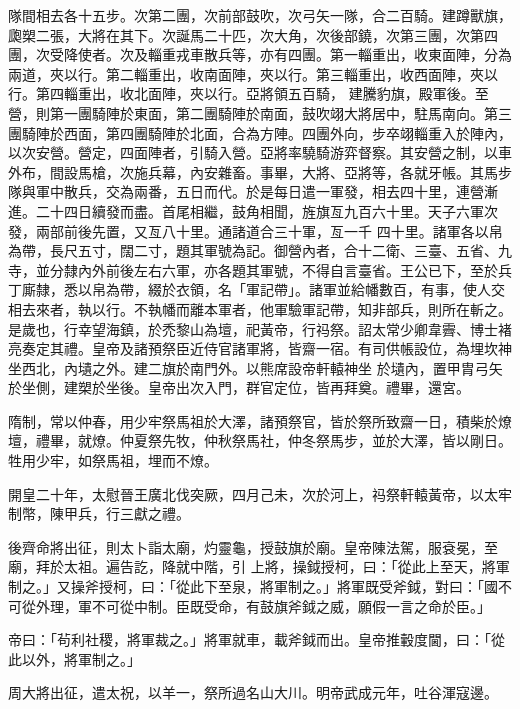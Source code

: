 \begin{pinyinscope}
 隊間相去各十五步。次第二團，次前部鼓吹，次弓矢一隊，合二百騎。建蹲獸旗，瓟槊二張，大將在其下。次誕馬二十匹，次大角，次後部鐃，次第三團，次第四團，次受降使者。次及輜重戎車散兵等，亦有四團。第一輜重出，收東面陣，分為兩道，夾以行。第二輜重出，收南面陣，夾以行。第三輜重出，收西面陣，夾以行。第四輜重出，收北面陣，夾以行。亞將領五百騎，
 建騰豹旗，殿軍後。至營，則第一團騎陣於東面，第二團騎陣於南面，鼓吹翊大將居中，駐馬南向。第三團騎陣於西面，第四團騎陣於北面，合為方陣。四團外向，步卒翊輜重入於陣內，以次安營。營定，四面陣者，引騎入營。亞將率驍騎游弈督察。其安營之制，以車外布，間設馬槍，次施兵幕，內安雜畜。事畢，大將、亞將等，各就牙帳。其馬步隊與軍中散兵，交為兩番，五日而代。於是每日遣一軍發，相去四十里，連營漸進。二十四日續發而盡。首尾相繼，鼓角相聞，旌旗亙九百六十里。天子六軍次發，兩部前後先置，又亙八十里。通諸道合三十軍，亙一千
 四十里。諸軍各以帛為帶，長尺五寸，闊二寸，題其軍號為記。御營內者，合十二衛、三臺、五省、九寺，並分隸內外前後左右六軍，亦各題其軍號，不得自言臺省。王公已下，至於兵丁廝隸，悉以帛為帶，綴於衣領，名「軍記帶」。諸軍並給幡數百，有事，使人交相去來者，執以行。不執幡而離本軍者，他軍驗軍記帶，知非部兵，則所在斬之。是歲也，行幸望海鎮，於禿黎山為壇，祀黃帝，行祃祭。詔太常少卿韋霽、博士褚亮奏定其禮。皇帝及諸預祭臣近侍官諸軍將，皆齋一宿。有司供帳設位，為埋坎神坐西北，內壝之外。建二旗於南門外。以熊席設帝軒轅神坐
 於壝內，置甲胄弓矢於坐側，建槊於坐後。皇帝出次入門，群官定位，皆再拜奠。禮畢，還宮。



 隋制，常以仲春，用少牢祭馬祖於大澤，諸預祭官，皆於祭所致齋一日，積柴於燎壇，禮畢，就燎。仲夏祭先牧，仲秋祭馬社，仲冬祭馬步，並於大澤，皆以剛日。牲用少牢，如祭馬祖，埋而不燎。



 開皇二十年，太慰晉王廣北伐突厥，四月己未，次於河上，祃祭軒轅黃帝，以太牢制幣，陳甲兵，行三獻之禮。



 後齊命將出征，則太卜詣太廟，灼靈龜，授鼓旗於廟。皇帝陳法駕，服袞冕，至廟，拜於太祖。遍告訖，降就中階，引
 上將，操鉞授柯，曰：「從此上至天，將軍制之。」又操斧授柯，曰：「從此下至泉，將軍制之。」將軍既受斧鉞，對曰：「國不可從外理，軍不可從中制。臣既受命，有鼓旗斧鉞之威，願假一言之命於臣。」



 帝曰：「茍利社稷，將軍裁之。」將軍就車，載斧鉞而出。皇帝推轂度閫，曰：「從此以外，將軍制之。」



 周大將出征，遣太祝，以羊一，祭所過名山大川。明帝武成元年，吐谷渾寇邊。




\end{pinyinscope}
